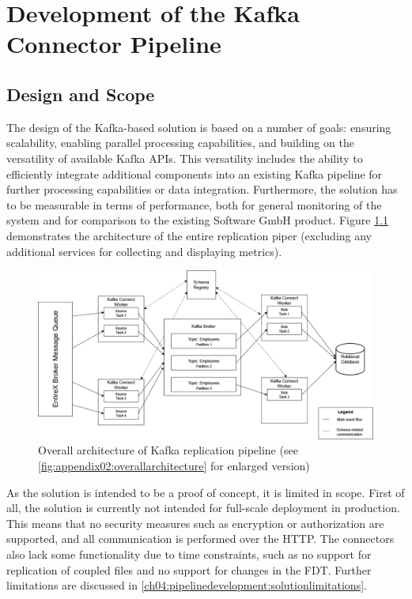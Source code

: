 \chapter{Development of the Kafka Connector Pipeline}
\label{ch04:pipelinedevelopment}

\section{Design and Scope}
The design of the Kafka-based solution is based on a number of goals: ensuring scalability, enabling parallel processing capabilities, and building on the versatility of available Kafka \ac{APIs}. This versatility includes the ability to efficiently integrate additional components into an existing Kafka pipeline for further processing capabilities or data integration. Furthermore, the solution has to be measurable in terms of performance, both for general monitoring of the system and for comparison to the existing Software GmbH product. Figure \ref{fig:chapter04:overallarchitecture} demonstrates the architecture of the entire replication piper (excluding any additional services for collecting and displaying metrics).

\begin{figure}[htbp]
 \centering
 \includegraphics[width=1\textwidth]{chapters/images/kafka pipeline overall architecture enlarged.drawio.png}
 \caption[Overall architecture of Kafka replication pipeline]{Overall architecture of Kafka replication pipeline (see \ref{fig:appendix02:overallarchitecture} for enlarged version)}
 \label{fig:chapter04:overallarchitecture}
\end{figure}

As the solution is intended to be a proof of concept, it is limited in scope. First of all, the solution is currently not intended for full-scale deployment in production. This means that no security measures such as encryption or authorization are supported, and all communication is performed over the \ac{HTTP}. The connectors also lack some functionality due to time constraints, such as no support for replication of coupled files and no support for changes in the \ac{FDT}. Further limitations are discussed in \ref{ch04:pipelinedevelopment:solutionlimitations}.

